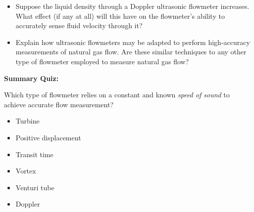 \begin{itemize}
\item{} Suppose the liquid density through a Doppler ultrasonic flowmeter increases.  What effect (if any at all) will this have on the flowmeter's ability to accurately sense fluid velocity through it?
\item{} Explain how ultrasonic flowmeters may be adapted to perform high-accuracy measurements of natural gas flow.  Are these similar techniques to any other type of flowmeter employed to measure natural gas flow?
\end{itemize}










\vfil \eject

\noindent
{\bf Summary Quiz:}

Which type of flowmeter relies on a constant and known {\it speed of sound} to achieve accurate flow measurement?

\begin{itemize}
\item{} Turbine
\vskip 5pt 
\item{} Positive displacement
\vskip 5pt 
\item{} Transit time
\vskip 5pt 
\item{} Vortex
\vskip 5pt 
\item{} Venturi tube
\vskip 5pt 
\item{} Doppler
\end{itemize}





